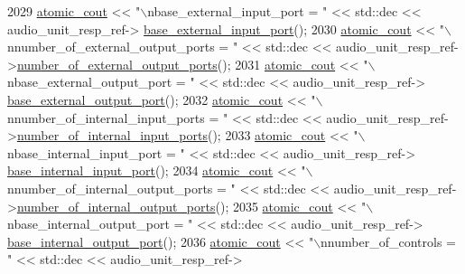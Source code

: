 \begin{DoxyCode}
2029             \hyperlink{cmd__line_8h_a0bc38ccc65c79ba06c6fcd7b4bf554c3}{atomic\_cout} << \textcolor{stringliteral}{"\(\backslash\)nbase\_external\_input\_port = "} << std::dec << audio\_unit\_resp\_ref->
      \hyperlink{classavdecc__lib_1_1audio__unit__descriptor__response_a169b284aa7abd0796a001e72d5ea54aa}{base\_external\_input\_port}();
2030             \hyperlink{cmd__line_8h_a0bc38ccc65c79ba06c6fcd7b4bf554c3}{atomic\_cout} << \textcolor{stringliteral}{"\(\backslash\)nnumber\_of\_external\_output\_ports = "} << std::dec << 
      audio\_unit\_resp\_ref->\hyperlink{classavdecc__lib_1_1audio__unit__descriptor__response_a28ebe15d58360e336a505fbf77212f5b}{number\_of\_external\_output\_ports}();
2031             \hyperlink{cmd__line_8h_a0bc38ccc65c79ba06c6fcd7b4bf554c3}{atomic\_cout} << \textcolor{stringliteral}{"\(\backslash\)nbase\_external\_output\_port = "} << std::dec << audio\_unit\_resp\_ref->
      \hyperlink{classavdecc__lib_1_1audio__unit__descriptor__response_ad891b196acc566e036227d8eba7b0c61}{base\_external\_output\_port}();
2032             \hyperlink{cmd__line_8h_a0bc38ccc65c79ba06c6fcd7b4bf554c3}{atomic\_cout} << \textcolor{stringliteral}{"\(\backslash\)nnumber\_of\_internal\_input\_ports = "} << std::dec << 
      audio\_unit\_resp\_ref->\hyperlink{classavdecc__lib_1_1audio__unit__descriptor__response_a7c75c66807196519640618422ea4fc26}{number\_of\_internal\_input\_ports}();
2033             \hyperlink{cmd__line_8h_a0bc38ccc65c79ba06c6fcd7b4bf554c3}{atomic\_cout} << \textcolor{stringliteral}{"\(\backslash\)nbase\_internal\_input\_port = "} << std::dec << audio\_unit\_resp\_ref->
      \hyperlink{classavdecc__lib_1_1audio__unit__descriptor__response_a3b4b45f0709b6e468429412df98ea417}{base\_internal\_input\_port}();
2034             \hyperlink{cmd__line_8h_a0bc38ccc65c79ba06c6fcd7b4bf554c3}{atomic\_cout} << \textcolor{stringliteral}{"\(\backslash\)nnumber\_of\_internal\_output\_ports = "} << std::dec << 
      audio\_unit\_resp\_ref->\hyperlink{classavdecc__lib_1_1audio__unit__descriptor__response_a760f7784d2269dee6d62d9da382d6f09}{number\_of\_internal\_output\_ports}();
2035             \hyperlink{cmd__line_8h_a0bc38ccc65c79ba06c6fcd7b4bf554c3}{atomic\_cout} << \textcolor{stringliteral}{"\(\backslash\)nbase\_internal\_output\_port = "} << std::dec << audio\_unit\_resp\_ref->
      \hyperlink{classavdecc__lib_1_1audio__unit__descriptor__response_ae2a2d4457cc9f741e612ed2b60fb1457}{base\_internal\_output\_port}();
2036             \hyperlink{cmd__line_8h_a0bc38ccc65c79ba06c6fcd7b4bf554c3}{atomic\_cout} << \textcolor{stringliteral}{"\(\backslash\)nnumber\_of\_controls = "} << std::dec << audio\_unit\_resp\_ref->

\end{DoxyCode}
